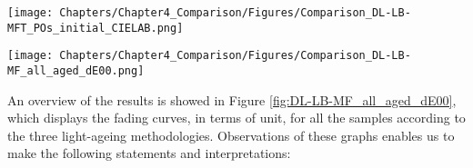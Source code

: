\begin{figure*}
\centering
\texttt{[image: Chapters/Chapter4\_Comparison/Figures/Comparison\_DL-LB-MFT\_POs\_initial\_CIELAB.png]}
\caption[\hspace{0.3cm}Initial colourimetric coordinates for each paint]{Initial colourimetric coordinates for each paint.}
\label{fig:PO_CIELAB_initial}
\end{figure*}




\begin{figure*}
\centering
\texttt{[image: Chapters/Chapter4\_Comparison/Figures/Comparison\_DL-LB-MF\_all\_aged\_dE00.png]}
\caption[\hspace{0.3cm}Comparison of the \dEOO curves for each sample]{Comparison of the \dEOO curves for each sample.}
\label{fig:DL-LB-MF_all_aged_dE00}
\end{figure*}

\newpage

An overview of the results is showed in Figure \ref{fig:DL-LB-MF_all_aged_dE00}, which displays the fading curves, in terms of \dEOO unit, for all the samples according to the three light-ageing methodologies. Observations of these graphs enables us to make the following statements and interpretations:

